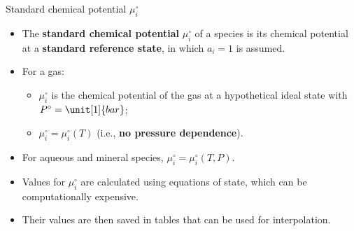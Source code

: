 %
%
\begin{frame}{Standard chemical potential $\mu_{i}^{\circ}$}
\begin{itemize}
\item The \textbf{standard chemical potential} $\mu_{i}^{\circ}$ of a
species is its chemical potential at a \alert{\bf{standard reference state}},
in which $a_{i}=1$ is assumed.
\pause
\item For a gas: 
\begin{itemize}
\item $\mu_{i}^{\circ}$ is the chemical potential
of the gas at a hypothetical ideal state with $P^{\circ}=\unit[1]{bar}$;
\item $\mu_{i}^{\circ}=\mu_{i}^{\circ}(T)$ (i.e., \textbf{no
pressure dependence}).
\end{itemize}
\pause
\item For aqueous and mineral species, ${\mu_{i}^{\circ}=\mu_{i}^{\circ}(T,P)}$.
\pause
\item Values for $\mu_{i}^{\circ}$ are calculated using equations of state,
which can be computationally expensive.
\pause
\item Their values are then saved in tables that can be used for interpolation.
\end{itemize}
\end{frame}
%
%
